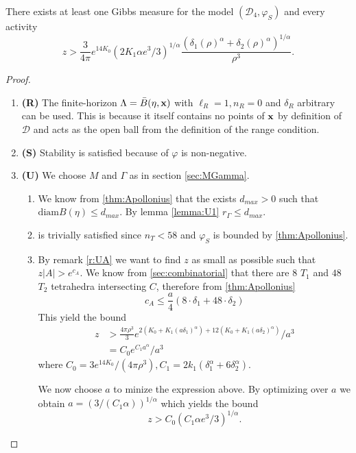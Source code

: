 \begin{theorem}\label{thm:E1}
	There exists at least one Gibbs measure for the model $(\mathcal D_4,\varphi_S)$ and every activity 
	$$z> \frac{3}{4\pi}e^{14 K_0}   (2K_1 \alpha e^3/3)^{1/\alpha} \frac{(\delta_1(\rho)^\alpha + \delta_2(\rho)^\alpha)^{1/\alpha}}{\rho^3}.$$
\end{theorem}
\begin{proof}
\begin{enumerate}[]
	\item \textbf{(R)} The finite-horizon $\Lambda = \bar B(\eta,{\mathbf{x}})$ with $\ell_R = 1, n_R = 0$ and $\delta_R$ arbitrary can be used. This is because it itself contains no points of ${\mathbf{x}}$ by definition of $\mathcal D$ and acts as the open ball from the definition of the range condition.
	\item \textbf{(S)} Stability is satisfied because of $\varphi$ is non-negative.
	\item \textbf{(U)} We choose $M$ and $\Gamma$ as in section \ref{sec:MGamma}.
		\begin{enumerate}[(U1)]
			\item We know from \ref{thm:Apollonius} that the exists $d_{max}>0$ such that $\text{diam}B(\eta)\leq d_{max}$. By lemma \ref{lemma:U1} $r_\Gamma\leq d_{max}.$
			\item is trivially satisfied since $n_T < 58$ and $\varphi_S$ is bounded by \ref{thm:Apollonius}.
			\item By remark \ref{r:UA} we want to find $z$ as small as possible such that $z|A|>e^{c_A}.$ We know from \ref{sec:combinatorial} that there are $8$ $T_1$ and $48$ $T_2$ tetrahedra intersecting $C$, therefore from \ref{thm:Apollonius}
				$$c_A \leq \frac a4 (8\cdot \delta_1 + 48\cdot \delta_2 )$$
				This yield the bound
				\begin{align*}z &> \frac{4\pi\rho^3}{3} e^{2(K_0 + K_1 (a\delta_1)^\alpha) + 12(K_0 + K_1(a \delta_2)^\alpha)} / a^3  \\
					&= C_0 e^{C_1 a^\alpha} / a^3  
				\end{align*}
				where $C_0 = 3e^{14K_0}/(4\pi \rho^3),  C_1 = 2k_1(\delta_1^\alpha + 6 \delta_2^\alpha)$.

				We now choose $a$ to minize the expression above. By optimizing over $a$ we obtain $a=(3/(C_1 \alpha))^{1/\alpha}$ which yields the bound 
				$$z> C_0(C_1 \alpha e^3/ 3 )^{1/\alpha}.$$
		\end{enumerate}
\end{enumerate}
\end{proof}



